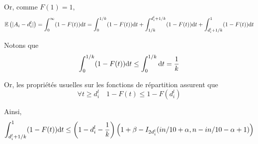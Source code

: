 
Or, comme \(F(1) = 1\),
\[
    \mathbb E\left( |A_i - d_i^l| \right) = \int_0^{\infty} (1 - F(t))\mathrm{d} t = \int_{0}^{1/k} (1 - F(t))\mathrm{d} t + \int_{1/k}^{d_i^l + 1/k} (1 - F(t))\mathrm{d} t + \int_{d_i^l + 1/k}^{1} (1 - F(t))\mathrm{d} t
\]

Notons que 
\[
    \int_0^{1/k} (1 - F(t))\mathrm{d} t \leq \int_0^{1/k}\mathrm{d} t = \dfrac{1}{k}
\]



Or, les propriétés usuelles sur les fonctions de répartition assurent que 
\[
    \forall t \geq d_i^l \quad 1 - F(t) \leq 1 - F(d_i^l)
\]

Ainsi,
\[
    \int_{d_i^l + 1/k}^{1} (1 - F(t))\mathrm{d} t \leq \left(1 - d_i^l - \dfrac{1}{k}\right)\left(1 + \beta -  I_{2d_i^l}(in/10 + \alpha, n - in/10 -  \alpha + 1) \right)
\]


